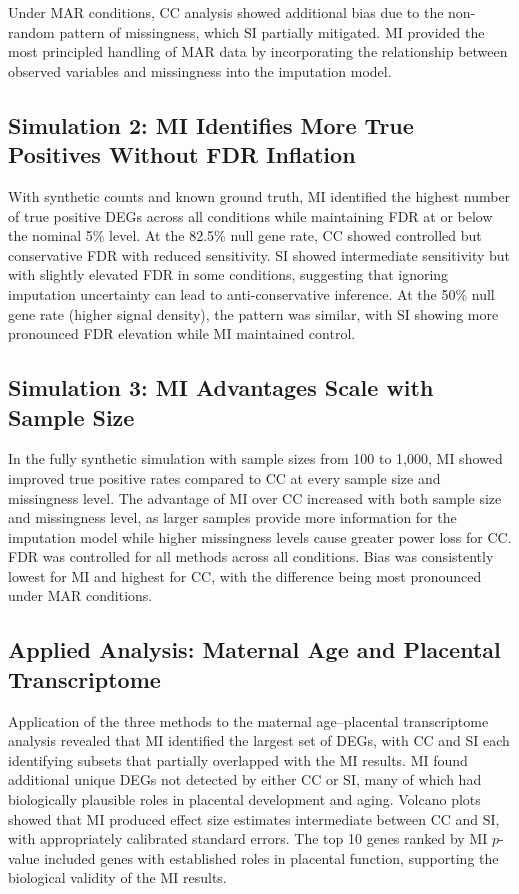 \documentclass[11pt]{article}
\begin{document}
Under MAR conditions, CC analysis showed additional bias due to the non-random pattern of missingness, which SI partially mitigated. MI provided the most principled handling of MAR data by incorporating the relationship between observed variables and missingness into the imputation model.

\subsection{Simulation 2: MI Identifies More True Positives Without FDR Inflation}

With synthetic counts and known ground truth, MI identified the highest number of true positive DEGs across all conditions while maintaining FDR at or below the nominal 5\% level. At the 82.5\% null gene rate, CC showed controlled but conservative FDR with reduced sensitivity. SI showed intermediate sensitivity but with slightly elevated FDR in some conditions, suggesting that ignoring imputation uncertainty can lead to anti-conservative inference. At the 50\% null gene rate (higher signal density), the pattern was similar, with SI showing more pronounced FDR elevation while MI maintained control.

\subsection{Simulation 3: MI Advantages Scale with Sample Size}

In the fully synthetic simulation with sample sizes from 100 to 1,000, MI showed improved true positive rates compared to CC at every sample size and missingness level. The advantage of MI over CC increased with both sample size and missingness level, as larger samples provide more information for the imputation model while higher missingness levels cause greater power loss for CC. FDR was controlled for all methods across all conditions. Bias was consistently lowest for MI and highest for CC, with the difference being most pronounced under MAR conditions.

\subsection{Applied Analysis: Maternal Age and Placental Transcriptome}

Application of the three methods to the maternal age--placental transcriptome analysis revealed that MI identified the largest set of DEGs, with CC and SI each identifying subsets that partially overlapped with the MI results. MI found additional unique DEGs not detected by either CC or SI, many of which had biologically plausible roles in placental development and aging. Volcano plots showed that MI produced effect size estimates intermediate between CC and SI, with appropriately calibrated standard errors. The top 10 genes ranked by MI $p$-value included genes with established roles in placental function, supporting the biological validity of the MI results.
\end{document}
